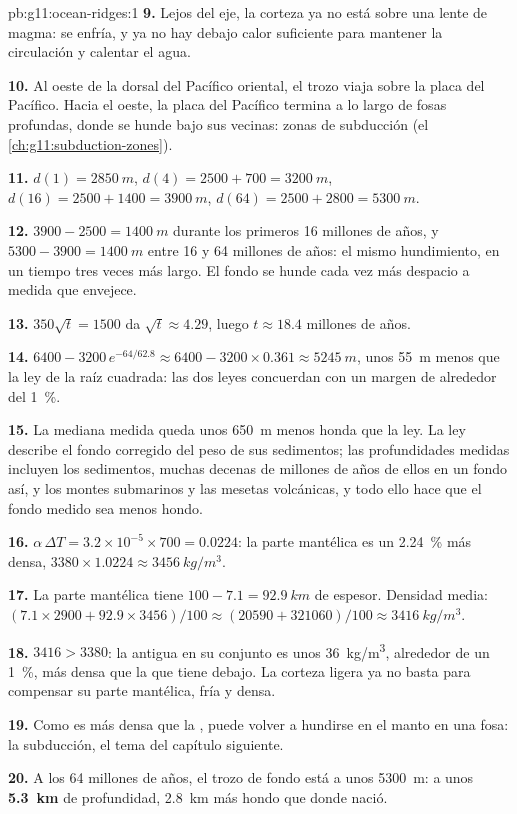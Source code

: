 \begin{solution}{pb:g11:ocean-ridges:1}
\textbf{9.} Lejos del eje, la corteza ya no está sobre una lente de magma: se
enfría, y ya no hay debajo calor suficiente para mantener la circulación y
calentar el agua.

\textbf{10.} Al oeste de la dorsal del Pacífico oriental, el trozo viaja sobre
la placa del Pacífico. Hacia el oeste, la placa del Pacífico termina a lo
largo de fosas profundas, donde se hunde bajo sus vecinas: zonas de subducción (el \cref{ch:g11:subduction-zones}).

\textbf{11.} $d(1) = \qty{2850}{m}$, $d(4) = 2500 + 700 = \qty{3200}{m}$,
$d(16) = 2500 + 1400 = \qty{3900}{m}$, $d(64) = 2500 + 2800 = \qty{5300}{m}$.

\textbf{12.} $3900 - 2500 = \qty{1400}{m}$ durante los primeros 16 millones de
años, y $5300 - 3900 = \qty{1400}{m}$ entre 16 y 64 millones de años: el mismo
hundimiento, en un tiempo tres veces más largo. El fondo se hunde cada vez más
despacio a medida que envejece.

\textbf{13.} $350\sqrt{t} = 1500$ da $\sqrt{t} \approx 4.29$, luego
$t \approx 18.4$ millones de años.

\textbf{14.} $6400 - 3200\,e^{-64/62.8} \approx 6400 - 3200 \times 0.361
\approx \qty{5245}{m}$, unos \qty{55}{m} menos que la ley de la raíz cuadrada:
las dos leyes concuerdan con un margen de alrededor del \qty{1}{\percent}.

\textbf{15.} La mediana medida queda unos \qty{650}{m} menos honda que la ley.
La ley describe el fondo corregido del peso de sus sedimentos; las
profundidades medidas incluyen los sedimentos, muchas decenas de millones de
años de ellos en un fondo así, y los montes submarinos y las mesetas
volcánicas, y todo ello hace que el fondo medido sea menos hondo.

\textbf{16.} $\alpha\,\Delta T = 3.2 \times 10^{-5} \times 700 = 0.0224$: la
parte mantélica es un \qty{2.24}{\percent} más densa,
$3380 \times 1.0224 \approx \qty{3456}{kg/m^3}$.

\textbf{17.} La parte mantélica tiene $100 - 7.1 = \qty{92.9}{km}$ de espesor.
Densidad media: $(7.1 \times 2900 + 92.9 \times 3456)/100 \approx (20590 + 321060)/100
\approx \qty{3416}{kg/m^3}$.

\textbf{18.} $3416 > 3380$: la  antigua en su conjunto es unos
\qty{36}{kg/m^3}, alrededor de un \qty{1}{\percent}, más densa que la
 que tiene debajo. La corteza ligera ya no basta para compensar su
parte mantélica, fría y densa.

\textbf{19.} Como es más densa que la , puede volver a hundirse en
el manto en una fosa: la subducción, el tema del capítulo siguiente.

\textbf{20.} A los 64 millones de años, el trozo de fondo está a unos
\qty{5300}{m}: a unos \textbf{5.3~km} de profundidad, \qty{2.8}{km} más hondo
que donde nació.
\end{solution}
